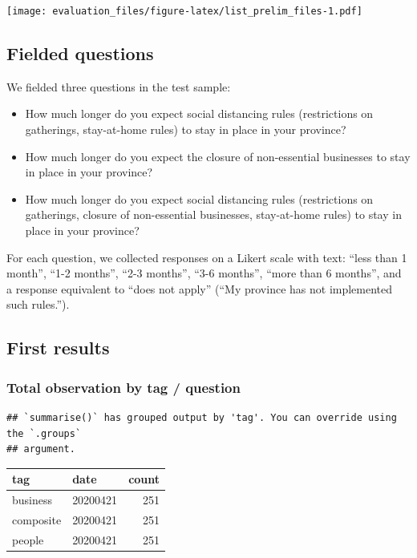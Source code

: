 \documentclass[
]{article}
\providecommand{\tightlist}{%
  \setlength{\itemsep}{0pt}\setlength{\parskip}{0pt}}
\begin{document}
\texttt{[image: evaluation\_files/figure-latex/list\_prelim\_files-1.pdf]}

\hypertarget{fielded-questions}{%
\subsection{Fielded questions}\label{fielded-questions}}

We fielded three questions in the test sample:

\begin{itemize}
\tightlist
\item
  How much longer do you expect social distancing rules (restrictions on
  gatherings, stay-at-home rules) to stay in place in your province?
\item
  How much longer do you expect the closure of non-essential businesses
  to stay in place in your province?
\item
  How much longer do you expect social distancing rules (restrictions on
  gatherings, closure of non-essential businesses, stay-at-home rules)
  to stay in place in your province?
\end{itemize}

For each question, we collected responses on a Likert scale with text:
``less than 1 month'', ``1-2 months'', ``2-3 months'', ``3-6 months'',
``more than 6 months'', and a response equivalent to ``does not apply''
(``My province has not implemented such rules.'').

\hypertarget{first-results}{%
\subsection{First results}\label{first-results}}

\hypertarget{total-observation-by-tag-question}{%
\subsubsection{Total observation by tag /
question}\label{total-observation-by-tag-question}}

\begin{verbatim}
## `summarise()` has grouped output by 'tag'. You can override using the `.groups`
## argument.
\end{verbatim}

\begin{longtable}[]{@{}llr@{}}
\toprule
tag & date & count \\
\midrule
\endhead
business & 20200421 & 251 \\
composite & 20200421 & 251 \\
people & 20200421 & 251 \\
\bottomrule
\end{longtable}
\end{document}
